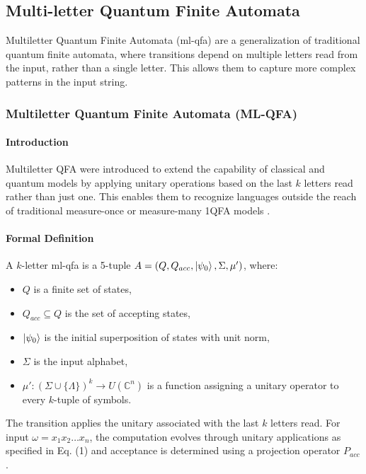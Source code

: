 \subsection{Multi-letter Quantum Finite Automata}
\label{sec:multi-letter-qfa}

Multiletter Quantum Finite Automata (\gls{ml-qfa}) are a generalization of traditional quantum finite automata, where transitions depend on multiple letters read from the input, rather than a single letter. This allows them to capture more complex patterns in the input string.

\subsubsection{Multiletter Quantum Finite Automata (ML-QFA)}

\paragraph{Introduction}
Multiletter QFA were introduced to extend the capability of classical and quantum models by applying unitary operations based on the last $k$ letters read rather than just one. This enables them to recognize languages outside the reach of traditional measure-once or measure-many 1QFA models \cite{belovs2007multi}.

\paragraph{Formal Definition}
A $k$-letter \gls{ml-qfa} is a 5-tuple $A = (Q, Q_{acc}, \ket{\psi_0}, \Sigma, \mu')$, where:
\begin{itemize}
    \item $Q$ is a finite set of states,
    \item $Q_{acc} \subseteq Q$ is the set of accepting states,
    \item $\ket{\psi_0}$ is the initial superposition of states with unit norm,
    \item $\Sigma$ is the input alphabet,
    \item $\mu': (\Sigma \cup \{\Lambda\})^k \to U(\mathbb{C}^n)$ is a function assigning a unitary operator to every $k$-tuple of symbols.
\end{itemize}
The transition applies the unitary associated with the last $k$ letters read. For input $\omega = x_1 x_2 \dots x_n$, the computation evolves through unitary applications as specified in Eq. (1) and acceptance is determined using a projection operator $P_{acc}$ \cite{qiu2009hierarchy}.

